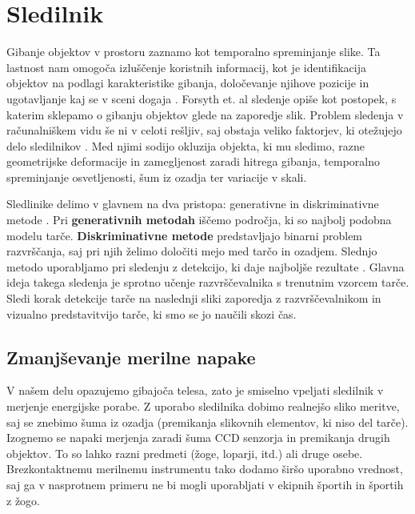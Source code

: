\section{Sledilnik}
%
Gibanje objektov v prostoru zaznamo kot temporalno spreminjanje slike. Ta lastnost nam omogoča izluščenje koristnih informacij, kot je identifikacija objektov na podlagi karakteristike gibanja, določevanje njihove pozicije in ugotavljanje kaj se v sceni dogaja \cite{forsyth2002computer}. Forsyth et. al \cite{forsyth2002computer} sledenje opiše kot postopek, s katerim sklepamo o gibanju objektov glede na zaporedje slik. Problem sledenja v računalniškem vidu še ni v celoti rešljiv, saj obstaja veliko faktorjev, ki otežujejo delo sledilnikov \cite{danelljan2014adaptive}. Med njimi sodijo okluzija objekta, ki mu sledimo, razne geometrijske deformacije in zamegljenost zaradi hitrega gibanja, temporalno spreminjanje osvetljenosti, šum iz ozadja ter variacije v skali. 

Sledlinike delimo v glavnem na dva pristopa: generativne in diskriminativne metode \cite{danelljan2014adaptive}. Pri \textbf{generativnih metodah} iščemo področja, ki so najbolj podobna modelu tarče. \textbf{Diskriminativne metode} predstavljajo binarni problem razvrščanja, saj pri njih želimo določiti mejo med tarčo in ozadjem. Slednjo metodo uporabljamo pri sledenju z detekcijo, ki daje najboljše rezultate \cite{danelljan2014adaptive}. Glavna ideja takega sledenja je sprotno učenje razvrščevalnika s trenutnim vzorcem tarče. Sledi korak detekcije tarče na naslednji sliki zaporedja z razvrščevalnikom in vizualno predstavitvijo tarče, ki smo se jo naučili skozi čas.






\subsection{Zmanjševanje merilne napake}

V našem delu opazujemo gibajoča telesa, zato je smiselno vpeljati sledilnik v merjenje energijske porabe. Z uporabo sledilnika dobimo realnejšo sliko meritve, saj se znebimo šuma iz ozadja (premikanja slikovnih elementov, ki niso del tarče). Izognemo se napaki merjenja zaradi šuma CCD senzorja in premikanja drugih objektov. To so lahko razni predmeti (žoge, loparji, itd.) ali druge osebe. Brezkontaktnemu merilnemu instrumentu tako dodamo širšo uporabno vrednost, saj ga v nasprotnem primeru ne bi mogli uporabljati v ekipnih športih in športih z žogo. 

